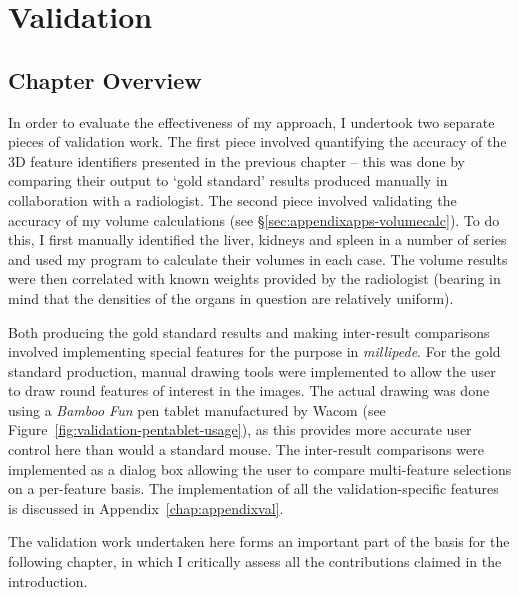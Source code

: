 \chapter{Validation}
\label{chap:validation}

\vspace{-\baselineskip}

\section{Chapter Overview}

In order to evaluate the effectiveness of my approach, I undertook two separate pieces of validation work. The first piece involved quantifying the accuracy of the 3D feature identifiers presented in the previous chapter -- this was done by comparing their output to `gold standard' results produced manually in collaboration with a radiologist. The second piece involved validating the accuracy of my volume calculations (see \S\ref{sec:appendixapps-volumecalc}). To do this, I first manually identified the liver, kidneys and spleen in a number of series and used my program to calculate their volumes in each case. The volume results were then correlated with known weights provided by the radiologist (bearing in mind that the densities of the organs in question are relatively uniform).

Both producing the gold standard results and making inter-result comparisons involved implementing special features for the purpose in \emph{millipede}. For the gold standard production, manual drawing tools were implemented to allow the user to draw round features of interest in the images. The actual drawing was done using a \emph{Bamboo Fun} pen tablet manufactured by Wacom (see Figure~\ref{fig:validation-pentablet-usage}), as this provides more accurate user control here than would a standard mouse. The inter-result comparisons were implemented as a dialog box allowing the user to compare multi-feature selections on a per-feature basis. The implementation of all the validation-specific features is discussed in Appendix~\ref{chap:appendixval}.

The validation work undertaken here forms an important part of the basis for the following chapter, in which I critically assess all the contributions claimed in the introduction.

